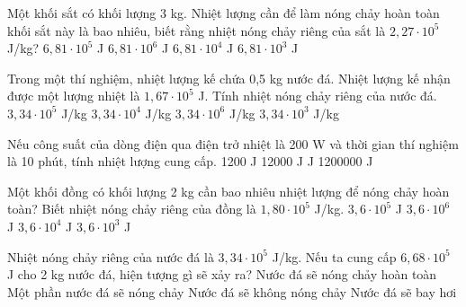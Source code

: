 \begin{ex}
Một khối sắt có khối lượng 3 kg. Nhiệt lượng cần để làm nóng chảy hoàn toàn khối sắt này là bao nhiêu, biết rằng nhiệt nóng chảy riêng của sắt là $2,27 \cdot 10^5$ J/kg?
\choice
{\True $6,81 \cdot 10^5$ J}
{$6,81 \cdot 10^6$ J}
{$6,81 \cdot 10^4$ J}
{$6,81 \cdot 10^3$ J}
\end{ex}

\begin{ex}
Trong một thí nghiệm, nhiệt lượng kế chứa 0,5 kg nước đá. Nhiệt lượng kế nhận được một lượng nhiệt là $1,67 \cdot 10^5$ J. Tính nhiệt nóng chảy riêng của nước đá.
\choice
{\True $3,34 \cdot 10^5$ J/kg}
{$3,34 \cdot 10^4$ J/kg}
{$3,34 \cdot 10^6$ J/kg}
{$3,34 \cdot 10^3$ J/kg}
\end{ex}

\begin{ex}
Nếu công suất của dòng điện qua điện trở nhiệt là 200 W và thời gian thí nghiệm là 10 phút, tính nhiệt lượng cung cấp.
\choice
{1200 J}
{12000 J}
{ J}
{1200000 J}
\end{ex}

\begin{ex}
Một khối đồng có khối lượng 2 kg cần bao nhiêu nhiệt lượng để nóng chảy hoàn toàn? Biết nhiệt nóng chảy riêng của đồng là $1,80 \cdot 10^5$ J/kg.
\choice
{\True $3,6 \cdot 10^5$ J}
{$3,6 \cdot 10^6$ J}
{$3,6 \cdot 10^4$ J}
{$3,6 \cdot 10^3$ J}
\end{ex}

\begin{ex}
Nhiệt nóng chảy riêng của nước đá là $3,34 \cdot 10^5$ J/kg. Nếu ta cung cấp $6,68 \cdot 10^5$ J cho 2 kg nước đá, hiện tượng gì sẽ xảy ra?
\choice
{\True Nước đá sẽ nóng chảy hoàn toàn}
{Một phần nước đá sẽ nóng chảy}
{Nước đá sẽ không nóng chảy}
{Nước đá sẽ bay hơi}
\end{ex}

